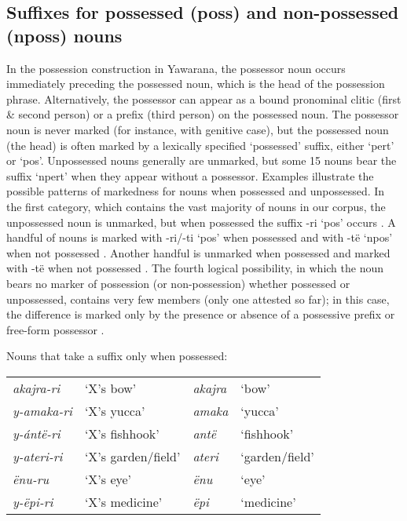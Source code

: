 \documentclass{memoir}
\begin{document}
\subsection{\texorpdfstring{Suffixes for possessed (poss) and
non-possessed (nposs) nouns
\label{sec:nounposssuf}}{Suffixes for possessed (poss) and non-possessed (nposs) nouns }}

In the possession construction in Yawarana, the possessor noun occurs
immediately preceding the possessed noun, which is the head of the
possession phrase. Alternatively, the possessor can appear as a bound
pronominal clitic (first \& second person) or a prefix (third person) on
the possessed noun. The possessor noun is never marked (for instance,
with genitive case), but the possessed noun (the head) is often marked
by a lexically specified `possessed' suffix, either  `pert' or
 `pos'. Unpossessed nouns generally are unmarked, but some 15
nouns bear the suffix  `npert' when they appear without a
possessor. Examples  illustrate
the possible patterns of markedness for nouns when possessed and
unpossessed. In the first category, which contains the vast majority of
nouns in our corpus, the unpossessed noun is unmarked, but when
possessed the suffix -ri `pos' occurs . A handful
of nouns is marked with -ri/-ti `pos' when possessed and with -të `npos'
when not possessed . Another handful is unmarked
when possessed and marked with -të when not possessed
. The fourth logical possibility, in which the
noun bears no marker of possession (or non-possession) whether possessed
or unpossessed, contains very few members (only one attested so far); in
this case, the difference is marked only by the presence or absence of a
possessive prefix or free-form possessor .

\ex\label{onlypossessed} Nouns that take a suffix only when possessed:

\begin{tabular}[t]{llll}

 \emph{akajra-ri} &          ‘X’s bow’ & \emph{akajra} &          ‘bow’ \\

\emph{y-amaka-ri} &        ‘X’s yucca’ &  \emph{amaka} &        ‘yucca’ \\
 \emph{y-ántë-ri} &     ‘X’s fishhook’ &   \emph{antë} &     ‘fishhook’ \\
\emph{y-ateri-ri} & ‘X’s garden/field’ &  \emph{ateri} & ‘garden/field’ \\
    \emph{ënu-ru} &          ‘X’s eye’ &    \emph{ënu} &          ‘eye’ \\
  \emph{y-ëpi-ri} &     ‘X’s medicine’ &    \emph{ëpi} &     ‘medicine’ \\

\end{tabular}
 \xe
\end{document}
